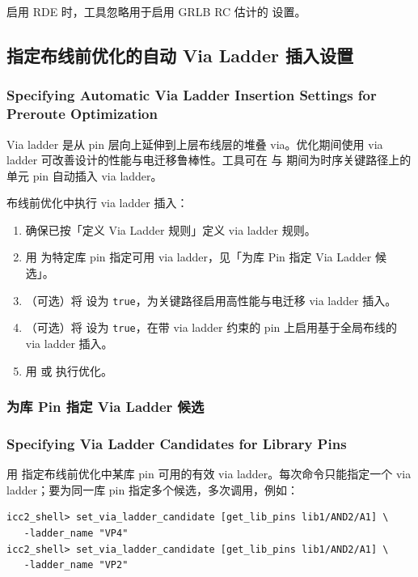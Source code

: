 启用 RDE 时，工具忽略用于启用 GRLB RC 估计的  设置。

\subsection{指定布线前优化的自动 Via Ladder 插入设置}
\subsubsection*{Specifying Automatic Via Ladder Insertion Settings for Preroute Optimization}

Via ladder 是从 pin 层向上延伸到上层布线层的堆叠 via。优化期间使用 via ladder 可改善设计的性能与电迁移鲁棒性。工具可在  与  期间为时序关键路径上的单元 pin 自动插入 via ladder。

布线前优化中执行 via ladder 插入：
\begin{enumerate}
  \item 确保已按「定义 Via Ladder 规则」定义 via ladder 规则。
  \item 用  为特定库 pin 指定可用 via ladder，见「为库 Pin 指定 Via Ladder 候选」。
  \item （可选）将  设为 \texttt{true}，为关键路径启用高性能与电迁移 via ladder 插入。
  \item （可选）将  设为 \texttt{true}，在带 via ladder 约束的 pin 上启用基于全局布线的 via ladder 插入。
  \item 用  或  执行优化。
\end{enumerate}

\subsubsection{为库 Pin 指定 Via Ladder 候选}
\subsubsection*{Specifying Via Ladder Candidates for Library Pins}

用  指定布线前优化中某库 pin 可用的有效 via ladder。每次命令只能指定一个 via ladder；要为同一库 pin 指定多个候选，多次调用，例如：
\begin{lstlisting}
icc2_shell> set_via_ladder_candidate [get_lib_pins lib1/AND2/A1] \
   -ladder_name "VP4"
icc2_shell> set_via_ladder_candidate [get_lib_pins lib1/AND2/A1] \
   -ladder_name "VP2"
\end{lstlisting}

